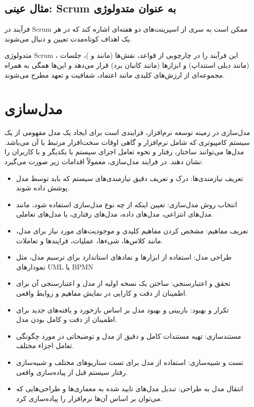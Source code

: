 \subsection*{مثال عینی: Scrum به عنوان متدولوژی}

فرآیند در Scrum ممکن است به سری از اسپرینت‌های دو هفته‌ای اشاره کند که در هر یک اهداف کوتاه‌مدت تعیین و دنبال می‌شوند.

متدولوژی Scrum ، این فرآیند را در چارچوبی از قواعد، نقش‌ها (مانند
و 
)، جلسات (مانند دیلی استنداپ) و ابزارها (مانند کانبان برد) قرار می‌دهد و این‌ها همگی به همراه مجموعه‌ای از ارزش‌های کلیدی مانند اعتماد، شفافیت و تعهد مطرح می‌شوند.

\section*{مدل‌سازی}

مدل‌سازی در زمینه توسعه نرم‌افزار، فرایندی است برای ایجاد یک مدل مفهومی از یک سیستم کامپیوتری که شامل نرم‌افزار و گاهی اوقات سخت‌افزار مرتبط با آن می‌باشد. مدل‌ها می‌توانند ساختار، رفتار و نحوه تعامل اجزای سیستم با یکدیگر و با کاربران را نشان دهند. در فرایند مدل‌سازی، معمولاً اقدامات زیر صورت می‌گیرد:

\begin{itemize}
	\item تعریف نیازمندی‌ها: درک و تعریف دقیق نیازمندی‌های سیستم که باید توسط مدل پوشش داده شوند.
	\item انتخاب روش مدل‌سازی: تعیین اینکه از چه نوع مدل‌سازی استفاده شود، مانند مدل‌های انتزاعی، مدل‌های داده، مدل‌های رفتاری، یا مدل‌های تعاملی.
	\item تعریف مفاهیم: مشخص کردن مفاهیم کلیدی و موجودیت‌های مورد نیاز برای مدل، مانند کلاس‌ها، شی‌ءها، عملیات، فرایندها و تعاملات.
	\item طراحی مدل: استفاده از ابزارها و نمادهای استاندارد برای ترسیم مدل، مثل نمودارهای UML یا BPMN
	\item تحقق و اعتبارسنجی: ساختن یک نسخه اولیه از مدل و اعتبارسنجی آن برای اطمینان از دقت و کارایی در نمایش مفاهیم و روابط واقعی.
	\item تکرار و بهبود: بازبینی و بهبود مدل بر اساس بازخورد و یافته‌های جدید برای اطمینان از دقت و کامل بودن مدل.
	\item مستندسازی: تهیه مستندات کامل و دقیق از مدل و توضیحاتی در مورد چگونگی تعامل اجزاء مختلف.
	\item تست و شبیه‌سازی: استفاده از مدل برای تست سناریوهای مختلف و شبیه‌سازی رفتار سیستم قبل از پیاده‌سازی واقعی.
	\item انتقال مدل به طراحی: تبدیل مدل‌های تایید شده به معماری‌ها و طراحی‌هایی که می‌توان بر اساس آن‌ها نرم‌افزار را پیاده‌سازی کرد.
\end{itemize}

